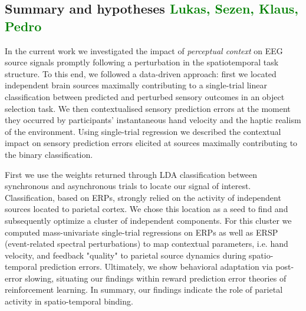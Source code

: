 \subsection{Summary and hypotheses \textcolor{green}{Lukas, Sezen, Klaus, Pedro}}
In the current work we investigated the impact of \textit{perceptual context} on EEG source signals promptly following a perturbation in the spatiotemporal task structure. To this end, we followed a data-driven approach: first we located independent brain sources maximally contributing to a single-trial linear classification between predicted and perturbed sensory outcomes in an object selection task. We then contextualised sensory prediction errors at the moment they occurred by participants' instantaneous hand velocity and the haptic realism of the environment. Using single-trial regression we described the contextual impact on sensory prediction errors elicited at sources maximally contributing to the binary classification.

First we use the weights returned through LDA classification between synchronous and asynchronous trials to locate our signal of interest. Classification, based on ERPs, strongly relied on the activity of independent sources located to parietal cortex. We chose this location as a seed to find and subsequently optimize a cluster of independent components. For this cluster we computed mass-univariate single-trial regressions on ERPs as well as ERSP (event-related spectral perturbations) to map contextual parameters, i.e. hand velocity, and feedback "quality" to parietal source dynamics during spatio-temporal prediction errors. Ultimately, we show behavioral adaptation via post-error slowing, situating our findings within reward prediction error theories of reinforcement learning. In summary, our findings indicate the role of parietal activity in spatio-temporal binding.


